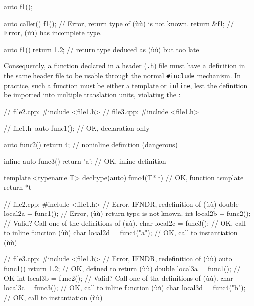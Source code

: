 \begin{emcppslisting}[emcppsstandards={c++14}]
auto f1();

auto caller()
{
    f1();       // Error, return type of (ù{}ù) is not known.
    return &f1; // Error, (ù{}ù) has incomplete type.
}

auto f1() { return 1.2; }  // return type deduced as (ù{}ù) but too late
\end{emcppslisting}
    

\noindent Consequently, a function declared in a header (\lstinline!.h!) file must
have a definition in the same header file to be usable through the
normal \lstinline!#include! mechanism. In practice, such a function must
be either a template or \lstinline!inline!, lest the definition be imported
into multiple translation units, violating the :

\begin{emcppshiddenlisting}[emcppsbatch=e3]
// file2.cpp:
#include <file1.h>
// file3.cpp:
#include <file1.h>
\end{emcppshiddenlisting}
\begin{emcppslisting}[emcppsbatch=e3,emcppsstandards={c++14}]
// file1.h:
auto func1();                        // OK, declaration only

auto func2() { return 4; }           // noninline definition (dangerous)

inline auto func3() { return 'a'; }  // OK, inline definition

template <typename T>
decltype(auto) func4(T* t)           // OK, function template
{
    return *t;
}

// file2.cpp:
#include <file1.h>            // Error, IFNDR, redefinition of (ù{}ù)
double local2a = func1();     // Error, (ù{}ù) return type is not known.
int    local2b = func2();     // Valid? Call one of the definitions of (ù{}ù).
char   local2c = func3();     // OK, call to inline function (ù{}ù)
char   local2d = func4("a");  // OK, call to instantiation (ù{}ù)

// file3.cpp:
#include <file1.h>            // Error, IFNDR, redefinition of (ù{}ù)
auto func1() { return 1.2; }  // OK, defined to return (ù{}ù)
double local3a = func1();     // OK
int    local3b = func2();     // Valid? Call one of the definitions of (ù{}ù).
char   local3c = func3();     // OK, call to inline function (ù{}ù)
char   local3d = func4("b");  // OK, call to instantiation (ù{}ù)
\end{emcppslisting}
    


